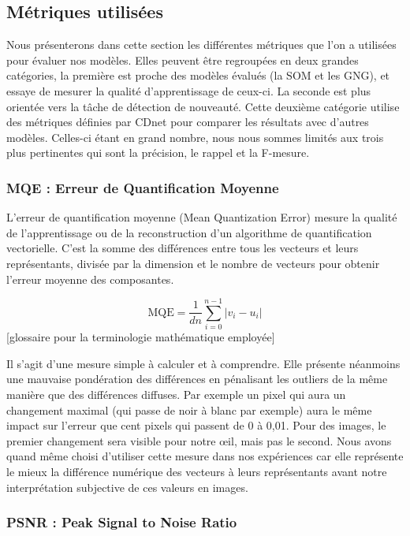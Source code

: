 	\subsection{Métriques utilisées}

	Nous présenterons dans cette section les différentes métriques que l'on a utilisées pour évaluer nos modèles. Elles peuvent être regroupées en deux grandes catégories, la première est proche des modèles évalués (la SOM et les GNG), et essaye de mesurer la qualité d'apprentissage de ceux-ci. La seconde est plus orientée vers la tâche de détection de nouveauté. Cette deuxième catégorie utilise des métriques définies par CDnet pour comparer les résultats avec d'autres modèles. Celles-ci étant en grand nombre, nous nous sommes limités aux trois plus pertinentes qui sont la précision, le rappel et la F-mesure.

	\subsubsection{MQE : Erreur de Quantification Moyenne}

	L'erreur de quantification moyenne (Mean Quantization Error) mesure la qualité de l'apprentissage ou de la reconstruction d'un algorithme de quantification vectorielle. C'est la somme des différences entre tous les vecteurs et leurs représentants, divisée par la dimension et le nombre de vecteurs pour obtenir l'erreur moyenne des composantes.
	
	\begin{equation}
		\text{MQE} = \frac{1}{dn} \sum_{i=0}^{n-1} |v_i - u_i|
	\end{equation}
	[glossaire pour la terminologie mathématique employée]

	Il s'agit d'une mesure simple à calculer et à comprendre. Elle présente néanmoins une mauvaise pondération des différences en pénalisant les outliers de la même manière que des différences diffuses. Par exemple un pixel qui aura un changement maximal (qui passe de noir à blanc par exemple) aura le même impact sur l'erreur que cent pixels qui passent de 0 à 0,01. Pour des images, le premier changement sera visible pour notre œil, mais pas le second. Nous avons quand même choisi d'utiliser cette mesure dans nos expériences car elle représente le mieux la différence numérique des vecteurs à leurs représentants avant notre interprétation subjective de ces valeurs en images.

	\subsubsection{PSNR : Peak Signal to Noise Ratio}

